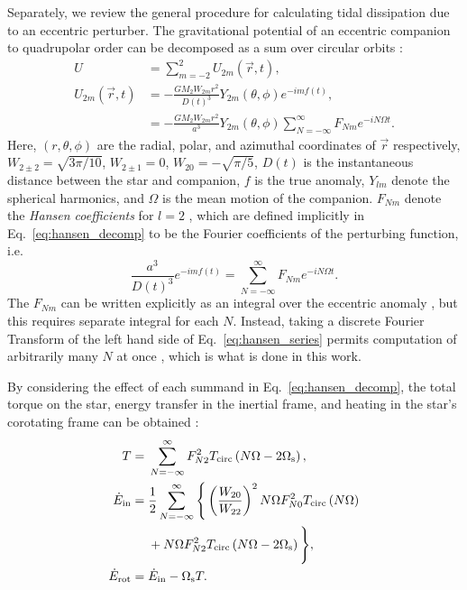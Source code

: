 \documentclass[
        fleqn,
        usenatbib,
    ]{mnras}
\newcommand*{\p}[1]{\left(#1\right)}
\begin{document}
Separately, we review the general procedure for calculating tidal dissipation
due to an eccentric perturber. The gravitational potential of an eccentric
companion to quadrupolar order can be decomposed as a sum over circular orbits
\citep[e.g.][]{sl,vlf}:
\begin{align}
    U &= \sum\limits_{m=-2}^2 U_{2m} \p{\vec{r}, t},\label{eq:u_ecc}\\
    U_{2m}\p{\vec{r}, t} &= -\frac{GM_2 W_{2m} r^2}{D(t)^3}
        Y_{2m}(\theta, \phi) e^{-imf(t)},\nonumber\\
        &= -\frac{GM_2W_{2m} r^2}{a^3}Y_{2m}\p{\theta, \phi}
            \sum\limits_{N = -\infty}^\infty F_{Nm}e^{-iN\Omega t}
            \label{eq:hansen_decomp}.
\end{align}
Here, $(r, \theta, \phi)$ are the radial, polar, and azimuthal coordinates of
$\vec{r}$ respectively, $W_{2 \pm 2} = \sqrt{3\pi/10}$, $W_{2 \pm 1} = 0$,
$W_{20} = -\sqrt{\pi / 5}$, $D(t)$ is the instantaneous distance between the
star and companion, $f$ is the true anomaly, $Y_{lm}$ denote the spherical
harmonics, and $\Omega$ is the mean motion of the companion. $F_{Nm}$ denote
the \emph{Hansen coefficients} for $l = 2$ \citep[also denoted $X^n_{2m}$
in][]{murray1999solar}, which are defined implicitly in
Eq.~\eqref{eq:hansen_decomp} to be the Fourier coefficients of the perturbing
function, i.e.
\begin{equation}
    \frac{a^3}{D(t)^3} e^{-imf(t)} = \sum\limits_{N = -\infty}^\infty
        F_{Nm} e^{-iN\Omega t}.\label{eq:hansen_series}
\end{equation}
The $F_{Nm}$ can be written explicitly as an integral over the eccentric anomaly
\citep{murray1999solar, sl}, but this requires separate integral for each $N$.
Instead, taking a discrete Fourier Transform of the left hand side of
Eq.~\eqref{eq:hansen_series} permits computation of arbitrarily many $N$ at once
\citep[as pointed out by][]{correia2014deformation}, which is what is done in
this work.

By considering the effect of each summand in Eq.~\eqref{eq:hansen_decomp}, the
total torque on the star, energy transfer in the inertial frame, and heating in
the star's corotating frame can be obtained \citep{sl, vlf}:
\begin{align}
    T ={}& \sum\limits_{N = -\infty}^\infty F_{N2}^2
        T_{\rm circ}\p{N\Omega - 2\Omega_{\rm s}},\label{eq:tau_sum}
        \\
    \dot{E}_{\rm in} ={}&
        \frac{1}{2}\sum\limits_{N = -\infty}^\infty\Bigg\{
            \p{\frac{W_{20}}{W_{22}}}^2 N\Omega F_{N0}^2 T_{\rm circ}\p{N\Omega}
                \nonumber\\
            &+ N\Omega F_{N2}^2 T_{\rm circ}\p{N\Omega - 2\Omega_{\rm s}}
            \Bigg\},\label{eq:edot_in}\\
    \dot{E}_{\rm rot} ={}& \dot{E}_{\rm in} - \Omega_{\rm s} T
        \label{eq:edot_rot}.
\end{align}
\end{document}
